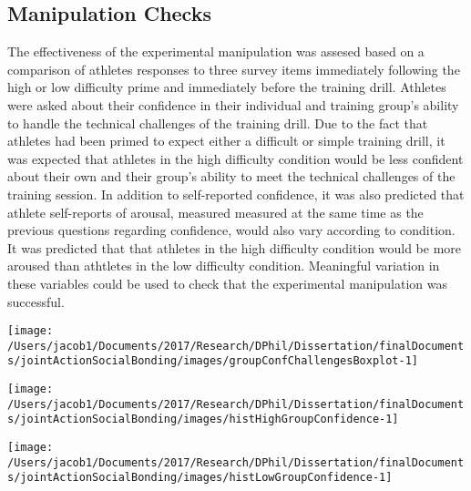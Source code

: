 \documentclass[english]{article}\usepackage[]{graphicx}\usepackage[]{color}
\makeatletter
\def\maxwidth{ %
  \ifdim\Gin@nat@width>\linewidth
    \linewidth
  \else
    \Gin@nat@width
  \fi
}
\newenvironment{knitrout}{}{} %
\makeatother
\begin{document}
\subsection{Manipulation Checks}
The effectiveness of the experimental manipulation was assesed based on a comparison of athletes responses to three survey items immediately following the high or low difficulty prime and immediately before the training drill.
Athletes were asked about their confidence in their individual and training group's ability to handle the technical challenges of the training drill.
Due to the fact that athletes had been primed to expect either a difficult or simple training drill, it was expected that athletes in the high difficulty condition would be less confident about their own and their group's ability to meet the technical challenges of the training session.
In addition to self-reported confidence, it was also predicted that athlete self-reports of arousal, measured measured at the same time as the previous questions regarding confidence, would also vary according to condition.
It was predicted that that athletes in the high difficulty condition would be more aroused than athtletes in the low difficulty condition.  Meaningful variation in these variables could be used to check that the experimental manipulation was successful.









\begin{knitrout}
\color{fgcolor}

{\centering \texttt{[image: /Users/jacob1/Documents/2017/Research/DPhil/Dissertation/finalDocuments/jointActionSocialBonding/images/groupConfChallengesBoxplot-1]} 

}



\end{knitrout}
\begin{knitrout}
\color{fgcolor}

{\centering \texttt{[image: /Users/jacob1/Documents/2017/Research/DPhil/Dissertation/finalDocuments/jointActionSocialBonding/images/histHighGroupConfidence-1]} 

}



\end{knitrout}
\begin{knitrout}
\color{fgcolor}

{\centering \texttt{[image: /Users/jacob1/Documents/2017/Research/DPhil/Dissertation/finalDocuments/jointActionSocialBonding/images/histLowGroupConfidence-1]} 

}



\end{knitrout}
\end{document}

